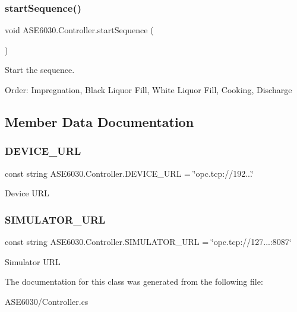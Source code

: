 \subsubsection{\texorpdfstring{start\+Sequence()}{startSequence()}}
{\footnotesize\ttfamily void A\+S\+E6030.\+Controller.\+start\+Sequence (\begin{DoxyParamCaption}{ }\end{DoxyParamCaption})\hspace{0.3cm}{\ttfamily [inline]}}



Start the sequence. 

Order\+: Impregnation, Black Liquor Fill, White Liquor Fill, Cooking, Discharge 

\subsection{Member Data Documentation}
\mbox{\label{class_a_s_e6030_1_1_controller_a2011ff29fbc80180267d0aba04e903aa}} 
\subsubsection{\texorpdfstring{D\+E\+V\+I\+C\+E\+\_\+\+U\+RL}{DEVICE\_URL}}
{\footnotesize\ttfamily const string A\+S\+E6030.\+Controller.\+D\+E\+V\+I\+C\+E\+\_\+\+U\+RL = \char`\"{}opc.\+tcp\+://192...\char`\"{}\hspace{0.3cm}{\ttfamily [private]}}

Device U\+RL \mbox{\label{class_a_s_e6030_1_1_controller_a6fca165bf2388426d598f23ac8d9acd6}} 
\subsubsection{\texorpdfstring{S\+I\+M\+U\+L\+A\+T\+O\+R\+\_\+\+U\+RL}{SIMULATOR\_URL}}
{\footnotesize\ttfamily const string A\+S\+E6030.\+Controller.\+S\+I\+M\+U\+L\+A\+T\+O\+R\+\_\+\+U\+RL = \char`\"{}opc.\+tcp\+://127...\+:8087\char`\"{}\hspace{0.3cm}{\ttfamily [private]}}

Simulator U\+RL 

The documentation for this class was generated from the following file\+:\begin{DoxyCompactItemize}
\item 
A\+S\+E6030/Controller.\+cs\end{DoxyCompactItemize}
